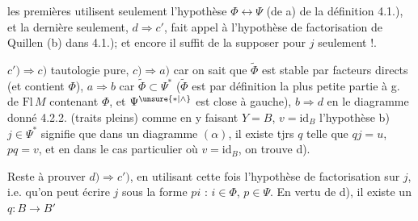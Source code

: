  les  premières utilisent seulement l'hypothèse $\Phi\longleftrightarrow\Psi$ (de a) de la définition 4.1.), et la dernière seulement, $d\Longrightarrow c'$, fait appel à l'hypothèse de factorisation de Quillen (b) dans 4.1.); et encore il suffit de la supposer pour $j$ seulement !.

$c')\Longrightarrow c)$ tautologie pure, $c)\Longrightarrow a)$ car on sait que $\widetilde\Phi$ est stable par facteurs directs (et contient $\Phi$), $a\Longrightarrow b$ car $\widetilde\Phi\subset\Psi^*$ ($\widetilde\Phi$ est par définition la plus petite partie  à g. de $\mathrm{Fl}\,M$ contenant $\Phi$, et $\Psi^{\unsure{*|\wedge}}$ est close à gauche), $b\Longrightarrow d$ en  le diagramme donné 4.2.2. (traits pleins) comme
en y faisant  $Y=B$, $v=\mathrm{id}_B$  l'hypothèse b) $j\in\Psi^*$ signifie que dans un diagramme  $(\alpha)$, il existe tjrs $q$ telle que $qj=u$, $pq=v$, et en  dans le cas particulier où $v=\mathrm{id}_B$, on trouve d).

Reste à prouver $d)\Longrightarrow c')$, en utilisant cette fois l'hypothèse de factorisation sur $j$, i.e. qu'on peut écrire $j$ sous la forme $pi$ :
 $i\in\Phi$, $p\in\Psi$. En vertu de d),  il existe un $q:B\longrightarrow B'$ 
